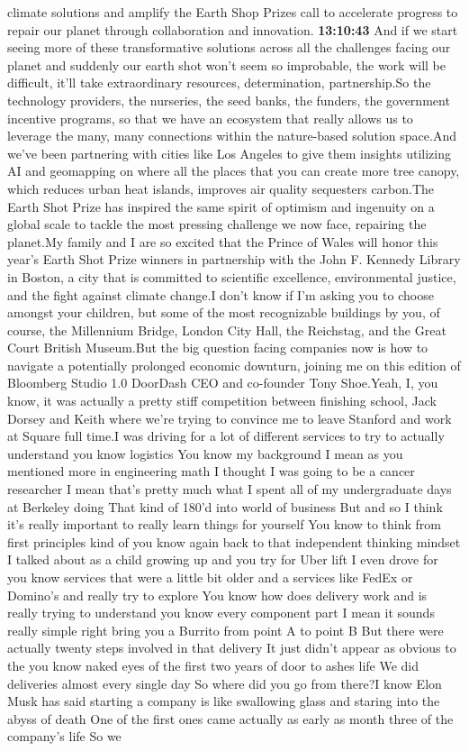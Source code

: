 \documentclass{article}%
\begin{document}
climate solutions and amplify the Earth Shop Prizes call to accelerate progress to repair our planet through collaboration and innovation.%
\textbf{13:10:43}%
\newline%
And if we start seeing more of these transformative solutions across all the challenges facing our planet and suddenly our earth shot won't seem so improbable, the work will be difficult, it'll take extraordinary resources, determination, partnership.So the technology providers, the nurseries, the seed banks, the funders, the government incentive programs, so that we have an ecosystem that really allows us to leverage the many, many connections within the nature{-}based solution space.And we've been partnering with cities like Los Angeles to give them insights utilizing AI and geomapping on where all the places that you can create more tree canopy, which reduces urban heat islands, improves air quality sequesters carbon.The Earth Shot Prize has inspired the same spirit of optimism and ingenuity on a global scale to tackle the most pressing challenge we now face, repairing the planet.My family and I are so excited that the Prince of Wales will honor this year's Earth Shot Prize winners in partnership with the John F. Kennedy Library in Boston, a city that is committed to scientific excellence, environmental justice, and the fight against climate change.I don't know if I'm asking you to choose amongst your children, but some of the most recognizable buildings by you, of course, the Millennium Bridge, London City Hall, the Reichstag, and the Great Court British Museum.But the big question facing companies now is how to navigate a potentially prolonged economic downturn, joining me on this edition of Bloomberg Studio 1.0 DoorDash CEO and co{-}founder Tony Shoe.Yeah, I, you know, it was actually a pretty stiff competition between finishing school, Jack Dorsey and Keith where we're trying to convince me to leave Stanford and work at Square full time.I was driving for a lot of different services to try to actually understand you know logistics You know my background I mean as you mentioned more in engineering math I thought I was going to be a cancer researcher I mean that's pretty much what I spent all of my undergraduate days at Berkeley doing That kind of 180'd into world of business But and so I think it's really important to really learn things for yourself You know to think from first principles kind of you know again back to that independent thinking mindset I talked about as a child growing up and you try for Uber lift I even drove for you know services that were a little bit older and a services like FedEx or Domino's and really try to explore You know how does delivery work and is really trying to understand you know every component part I mean it sounds really simple right bring you a Burrito from point A to point B But there were actually twenty steps involved in that delivery It just didn't appear as obvious to the you know naked eyes of the first two years of door to ashes life We did deliveries almost every single day So where did you go from there?I know Elon Musk has said starting a company is like swallowing glass and staring into the abyss of death One of the first ones came actually as early as month three of the company's life So we 
\end{document}
